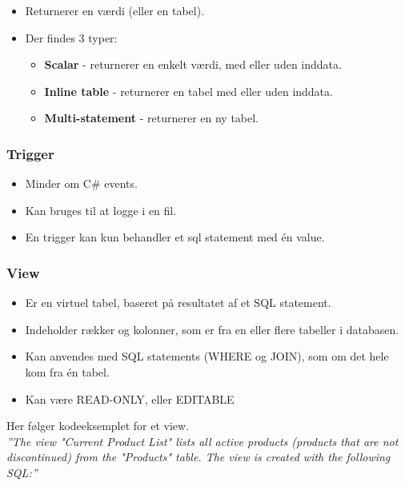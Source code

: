 \begin{itemize}
	\item Returnerer en værdi (eller en tabel).
	\item Der findes 3 typer:
	
	\begin{itemize}
		\item \textbf{Scalar} - returnerer en enkelt værdi, med eller uden inddata.
		\item \textbf{Inline table} - returnerer en tabel med eller uden inddata.
		\item \textbf{Multi-statement} - returnerer en ny tabel.
	\end{itemize}
\end{itemize}

\subsubsection{Trigger}

\begin{itemize}
	\item Minder om C\# events.
	\item Kan bruges til at logge i en fil. %
	\item En trigger kan kun behandler et sql statement med én value.
\end{itemize}

\subsubsection{View}

\begin{itemize}
	\item Er en virtuel tabel, baseret på resultatet af et SQL statement.
	\item Indeholder rækker og kolonner, som er fra en eller flere tabeller i databasen.
	\item Kan anvendes med SQL statements (WHERE og JOIN), som om det hele kom fra én tabel.
	\item Kan være READ-ONLY, eller EDITABLE
\end{itemize}

Her følger kodeeksemplet for et view. \\

\textit{''The view "Current Product List" lists all active products (products that are not discontinued) from the "Products" table. The view is created with the following SQL:''}

